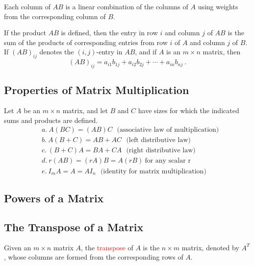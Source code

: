 \documentclass[12pt,a4paper]{article}
\begin{document}
Each column of $AB$ is a linear combination of the columns of $A$ using weights from the corresponding column of $B$.

\begin{tcolorbox}[colback=green!5,colframe=green!40!black,title= ROW-COLUMN RULE FOR COMPUTING $AB$]
If the product $AB$ is defined, then the entry in row $i$ and column $j$ of $AB$ is the sum of the products of corresponding entries from row $i$ of $A$ and column $j$ of $B$. If $(AB)_{ij}$ denotes the $(i, j)$-entry in $AB$, and if $A$ is an $m\times n$ matrix, then
\begin{equation*}
(AB)_{ij} = a_{i1} b_{1j} + a_{i2} b_{2j} +\cdots +a_{in}b_{nj} ~.
\end{equation*}
\end{tcolorbox}

\subsection{Properties of Matrix Multiplication}


\begin{tcolorbox}[colback=green!5,colframe=green!40!black,title= Theorem]
Let $A$ be an $m\times n$ matrix, and let $B$ and $C$ have sizes for which the indicated sums and products are defined.
\begin{align*}
& a. ~A(BC) = (AB)C ~~~ \text{(associative law of multiplication)} \\
& b. ~A(B + C) = AB + AC ~~~ \text{(left distributive law)} \\
& c. ~(B + C)A = BA + CA ~~~ \text{(right distributive law)} \\
& d. ~r(AB) = (rA)B = A(rB) ~\text{for any scalar r} \\
& e. ~I_m A = A = A I_n ~~~\text{(identity for matrix multiplication)}
\end{align*}
\end{tcolorbox}


\subsection{Powers of a Matrix}



\subsection{The Transpose of a Matrix}
Given an $m\times n$ matrix $A$, the \textcolor{red}{transpose} of $A$ is the $n\times m$ matrix, denoted by $A^T$, whose columns are formed from the corresponding rows of $A$.
\end{document}
